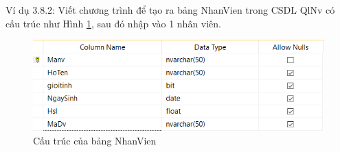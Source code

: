 Ví dụ 3.8.2: Viết chương trình để tạo ra bảng NhanVien trong CSDL QlNv có cấu trúc như Hình \ref*{hinh34}, sau đó nhập vào 1 nhân viên.
\begin{figure}[!ht]
	\centering
	\includegraphics[scale=0.8]{Figures//Hinh34.png}
	\caption{ Cấu trúc của bảng NhanVien }\label{hinh34} 
\end{figure}
